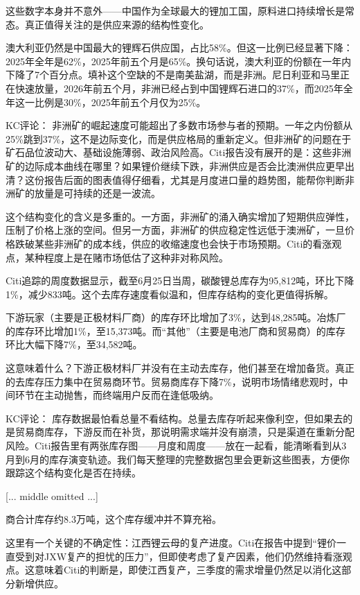 \documentclass[11pt]{ctexart}
\begin{document}
这些数字本身并不意外——中国作为全球最大的锂加工国，原料进口持续增长是常态。真正值得关注的是供应来源的结构性变化。

澳大利亚仍然是中国最大的锂辉石供应国，占比58\%。但这一比例已经显著下降：2025年全年是62\%，2025年前五个月是65\%。换句话说，澳大利亚的份额在一年内下降了7个百分点。填补这个空缺的不是南美盐湖，而是非洲。尼日利亚和马里正在快速放量，2026年前五个月，非洲已经占到中国锂辉石进口的37\%，而2025年全年这一比例是30\%，2025年前五个月仅为25\%。

KC评论： 非洲矿的崛起速度可能超出了多数市场参与者的预期。一年之内份额从25\%跳到37\%，这不是边际变化，而是供应格局的重新定义。但非洲矿的问题在于矿石品位波动大、基础设施薄弱、政治风险高。Citi报告没有展开的是：这些非洲矿的边际成本曲线在哪里？如果锂价继续下跌，非洲供应是否会比澳洲供应更早出清？这份报告后面的图表值得仔细看，尤其是月度进口量的趋势图，能帮你判断非洲矿的放量是可持续的还是一波流。

这个结构变化的含义是多重的。一方面，非洲矿的涌入确实增加了短期供应弹性，压制了价格上涨的空间。但另一方面，非洲矿的供应稳定性远低于澳洲矿，一旦价格跌破某些非洲矿的成本线，供应的收缩速度也会快于市场预期。Citi的看涨观点，某种程度上是在赌市场低估了这种非对称风险。

Citi追踪的周度数据显示，截至6月25日当周，碳酸锂总库存为95,812吨，环比下降1\%，减少833吨。这个去库存速度看似温和，但库存结构的变化更值得拆解。

下游玩家（主要是正极材料厂商）的库存环比增加了3\%，达到48,285吨。冶炼厂的库存环比增加1\%，至15,373吨。而“其他”（主要是电池厂商和贸易商）的库存环比大幅下降7\%，至34,582吨。

这意味着什么？下游正极材料厂并没有在主动去库存，他们甚至在增加备货。真正的去库存压力集中在贸易商环节。贸易商库存下降7\%，说明市场情绪悲观时，中间环节在主动抛售，而终端用户反而在逢低吸纳。

KC评论： 库存数据最怕看总量不看结构。总量去库存听起来像利空，但如果去的是贸易商库存，下游反而在补货，那说明需求端并没有崩溃，只是渠道在重新分配风险。Citi报告里有两张库存图——月度和周度——放在一起看，能清晰看到从3月到6月的库存演变轨迹。我们每天整理的完整数据包里会更新这些图表，方便你跟踪这个结构变化是否在持续。


[... middle omitted ...]

商合计库存约8.3万吨，这个库存缓冲并不算充裕。

这里有一个关键的不确定性：江西锂云母的复产进度。Citi在报告中提到“锂价一直受到对JXW复产的担忧的压力”，但即使考虑了复产因素，他们仍然维持看涨观点。这意味着Citi的判断是，即使江西复产，三季度的需求增量仍然足以消化这部分新增供应。
\end{document}
